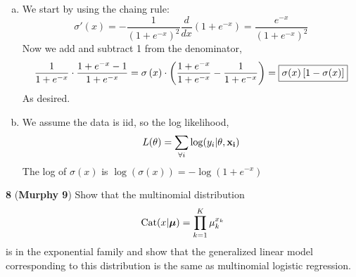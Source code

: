 \documentclass[12pt,letterpaper,fleqn]{hmcpset}
\begin{document}
\vspace{20mm}


\begin{solution}
	\begin{enumerate}[(a)]
		\item 
			We start by using the chaing rule:
			$$\sigma'(x) = -\frac{1}{(1+e^{-x})^2}\frac{d}{dx}(1+e^{-x}) = \frac{e^{-x}}{(1+e^{-x})^2}$$
			Now we add and subtract 1 from the denominator,
			$$\frac{1}{1 + e^{-x}} \cdot \frac{1 + e^{-x} -1}{1+e^{-x}} = \sigma \left(x\right) \cdot \left(\frac{1 + e^{-x}}{1+e^{-x}} - \frac{1}{1 + e^{-x}} \right) = \fbox{$\sigma(x)\left[1 - \sigma(x)\right]$}$$
			As desired.
		\item
			We assume the data is iid, so the log likelihood, 
			$$L(\theta) = \sum_{\forall i}\log (y_i | \theta, \bf{x}_i)$$
			The log of $\sigma (x)$ is $\log(\sigma(x)) =-\log (1 + e^{-x})$
	\end{enumerate}
\end{solution}

\textbf{8} (\textbf{Murphy 9}) Show that the multinomial distribution
\[
    \text{Cat}(x|\hbox{\boldmath$\mu$}) = \prod_{k=1}^K \mu_k^{x_k}
\]
is in the exponential family and show that the generalized linear model
corresponding to this distribution is the same as multinomial logistic
regression.
\end{document}
